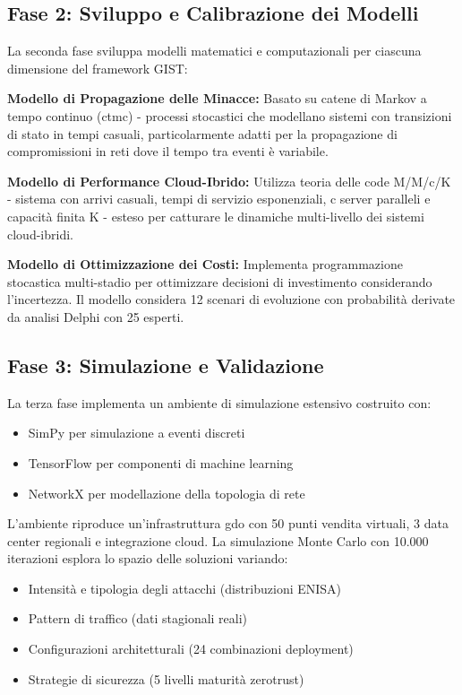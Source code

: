 \subsection{\texorpdfstring{Fase 2: Sviluppo e Calibrazione dei Modelli}{1.5.3 - Fase 2: Sviluppo e Calibrazione dei Modelli}}
\label{subsec:fase2}

La seconda fase sviluppa modelli matematici e computazionali per ciascuna dimensione del framework GIST:

\textbf{Modello di Propagazione delle Minacce:} Basato su catene di Markov a tempo continuo (\gls{ctmc}) - processi stocastici che modellano sistemi con transizioni di stato in tempi casuali, particolarmente adatti per la propagazione di compromissioni in reti dove il tempo tra eventi è variabile.

\textbf{Modello di Performance Cloud-Ibrido:} Utilizza teoria delle code M/M/c/K - sistema con arrivi casuali, tempi di servizio esponenziali, c server paralleli e capacità finita K - esteso per catturare le dinamiche multi-livello dei sistemi cloud-ibridi.

\textbf{Modello di Ottimizzazione dei Costi:} Implementa programmazione stocastica multi-stadio per ottimizzare decisioni di investimento considerando l'incertezza. Il modello considera 12 scenari di evoluzione con probabilità derivate da analisi Delphi con 25 esperti.

\subsection{\texorpdfstring{Fase 3: Simulazione e Validazione}{1.5.4 - Fase 3: Simulazione e Validazione}}
\label{subsec:fase3}

La terza fase implementa un ambiente di simulazione estensivo costruito con:
\begin{itemize}
\item SimPy per simulazione a eventi discreti
\item TensorFlow per componenti di machine learning
\item NetworkX per modellazione della topologia di rete
\end{itemize}

L'ambiente riproduce un'infrastruttura \gls{gdo} con 50 punti vendita virtuali, 3 data center regionali e integrazione cloud. La simulazione Monte Carlo con 10.000 iterazioni esplora lo spazio delle soluzioni variando:
\begin{itemize}
\item Intensità e tipologia degli attacchi (distribuzioni ENISA)
\item Pattern di traffico (dati stagionali reali)
\item Configurazioni architetturali (24 combinazioni deployment)
\item Strategie di sicurezza (5 livelli maturità \gls{zerotrust})
\end{itemize}

